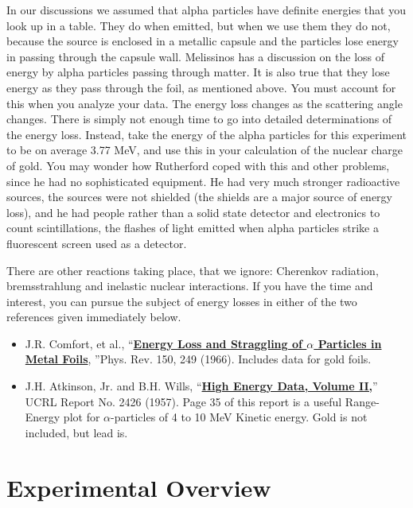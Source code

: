 \documentclass{../lab}
\begin{document}
In our discussions we assumed that alpha particles have definite energies that you look up in a table. They do when emitted, but when we use them they do not, because the source is enclosed in a metallic capsule and the particles lose energy in passing through the capsule wall. Melissinos has a discussion on the loss of energy by alpha particles passing through matter. It is also true that they lose energy as they pass through the foil, as mentioned above. You must account for this when you analyze your data. The energy loss changes as the scattering angle changes. There is simply not enough time to go into detailed determinations of the energy loss. Instead, take the energy of the alpha particles for this experiment to be on average 3.77 MeV, and use this in your calculation of the nuclear charge of gold. You may wonder how Rutherford coped with this and other problems, since he had no sophisticated equipment. He had very much stronger radioactive sources, the sources were not shielded (the shields are a major source of energy loss), and he had people rather than a solid state detector and electronics to count scintillations, the flashes of light emitted when alpha particles strike a fluorescent screen used as a detector.

There are other reactions taking place, that we ignore: Cherenkov radiation, bremsstrahlung and inelastic nuclear interactions. If you have the time and interest, you can pursue the subject of energy losses in either of the two references given immediately below.

\begin{itemize}
    \item J.R. Comfort, et al., ``\href{http://physics111.lib.berkeley.edu/Physics111/Reprints/RUT/01-Energy\_Loss\_and\_Straggling.pdf}{\textbf{Energy Loss and Straggling of $ \alpha $ Particles in Metal Foils}}, ''Phys. Rev. 150, 249 (1966). Includes data for gold foils.

    \item J.H. Atkinson, Jr. and B.H. Wills, ``\href{http://physics111.lib.berkeley.edu/Physics111/Reprints/RUT/02-High\_Energy\_Particle\_Data.pdf}{\textbf{High Energy Data, Volume II,}}'' UCRL Report No. 2426 (1957). Page 35 of this report is a useful Range-Energy plot for $ \alpha $-particles of 4 to 10 MeV Kinetic energy. Gold is not included, but lead is.
\end{itemize}

\section{Experimental Overview}
\end{document}
